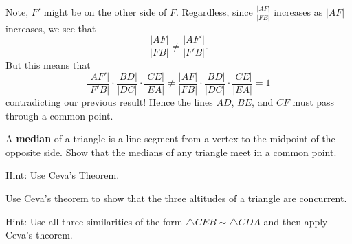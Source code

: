 \documentclass{ximera}
\begin{document}
\begin{question}
\begin{solution}
\begin{freeResponse}
\begin{image}
\end{image}
Note, $F'$ might be on the other side of $F$. Regardless, since
$\frac{|AF|}{|FB|}$ increases as $|AF|$ increases, we see that
\[
\frac{|AF|}{|FB|} \ne \frac{|AF'|}{|F'B|}.
\]
But this means that 
\[
\frac{|AF'|}{|F'B|}\cdot\frac{|BD|}{|DC|}\cdot\frac{|CE|}{|EA|}\ne\frac{|AF|}{|FB|}\cdot\frac{|BD|}{|DC|}\cdot\frac{|CE|}{|EA|}=1
\]
contradicting our previous result! Hence the lines $AD$, $BE$, and $CF$ must
pass through a common point.
\end{freeResponse}
\end{solution}
\end{question}

\begin{question}
A \textbf{median} of a triangle is a line segment from a vertex
to the midpoint of the opposite side. Show that the medians of any triangle
meet in a common point.

Hint: Use Ceva's Theorem.
\end{question}

\begin{question}
Use Ceva's theorem to show that the three altitudes of a
triangle are concurrent.
\begin{image}
\end{image}
Hint: Use all three similarities of the form $\triangle
CEB\sim\triangle CDA$ and then apply Ceva's theorem.
\end{question}
\end{document}
